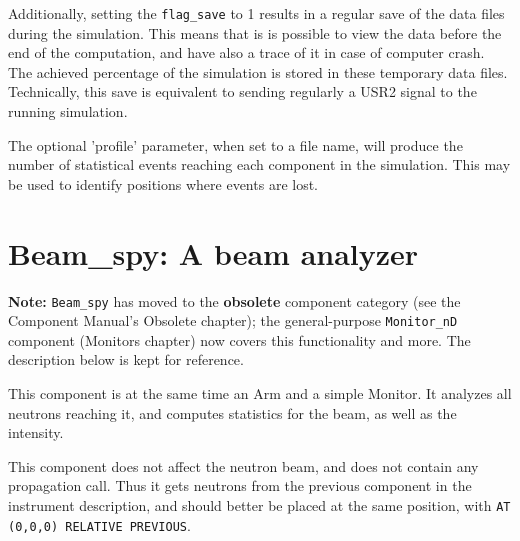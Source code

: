 Additionally, setting the \verb+flag_save+ to 1 results in
a regular save of the data files during the simulation.
This means that is is possible to view the data before the end
of the computation, and have also a trace of it in case of
computer crash. The achieved percentage of the simulation is stored in these temporary
data files. Technically, this save is equivalent to sending regularly
a USR2 signal to the running simulation.

The optional 'profile' parameter, when set to a file name, will produce the number of statistical events reaching each component in the simulation. This may be used to identify positions where events are lost.

\section{Beam\_spy: A beam analyzer}

\textbf{Note:} \texttt{Beam\_spy} has moved to the \textbf{obsolete} component
category (see the Component Manual's Obsolete chapter); the general-purpose
\texttt{Monitor\_nD} component (Monitors chapter) now covers this
functionality and more. The description below is kept for reference.

This component is at the same time an Arm and a simple Monitor. It analyzes all neutrons reaching it, and computes statistics for the beam, as well as the intensity.

This component does not affect the neutron beam, and does not contain any propagation call. Thus it gets neutrons from the previous component in the instrument description, and should better be placed at the same position, with \verb+AT (0,0,0) RELATIVE PREVIOUS+.
